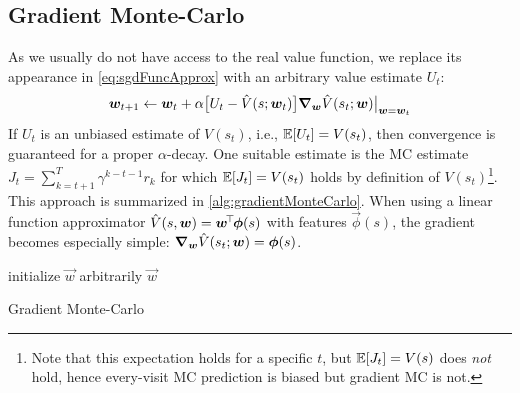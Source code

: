 		\subsection{Gradient Monte-Carlo}
			As we usually do not have access to the real value function, we replace its appearance in \eqref{eq:sgdFuncApprox} with an arbitrary value estimate \(U_t\):
			\begin{equation}
				\bm{w}_{t + 1} \gets \bm{w}_t + \alpha \bigl[ U_t - \hat{V}(s; \bm{w}_t) \bigr] \grad_{\bm{w}} \hat{V}(s_t; \bm{w}) \bigr\rvert_{\bm{w} = \bm{w}_t}
			\end{equation}
			If \(U_t\) is an unbiased estimate of \(V(s_t)\), i.e., \( \mathbb{E}[U_t] = V(s_t) \), then convergence is guaranteed for a proper \(\alpha\)-decay. One suitable estimate is the \ac{MC} estimate \( J_t = \sum_{k = t + 1}^{T} \gamma^{k - t - 1} r_k \) for which \( \mathbb{E}[J_t] = V(s_t) \) holds by definition of \(V(s_t)\)\footnote{Note that this expectation holds for a specific \(t\), but \( \mathbb{E}[J_t] = V(s) \) does \emph{not} hold, hence every-visit \ac{MC} prediction is biased but gradient \ac{MC} is not.}. This approach is summarized in \autoref{alg:gradientMonteCarlo}. When using a linear function approximator \( \hat{V}(s, \bm{w}) = \bm{w}^{\!\top\!} \bm{\phi}(s) \) with features \(\vec{\phi}(s)\), the gradient becomes especially simple: \( \grad_{\bm{w}} \hat{V}(s_t; \bm{w}) = \bm{\phi}(s) \).

			\begin{algorithm}  \DontPrintSemicolon
				initialize \(\vec{w}\) arbitrarily \;
				\Return \(\vec{w}\) \;
				\caption{Gradient Monte-Carlo}
				\label{alg:gradientMonteCarlo}
			\end{algorithm}

